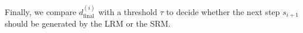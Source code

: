 \documentclass[11pt]{article}
\begin{document}
Finally, we compare $d_{\text{final}}^{(i)}$ with a threshold $\tau$ to decide whether the next step $s_{i+1}$ should be generated by the LRM or the SRM.
\end{document}
